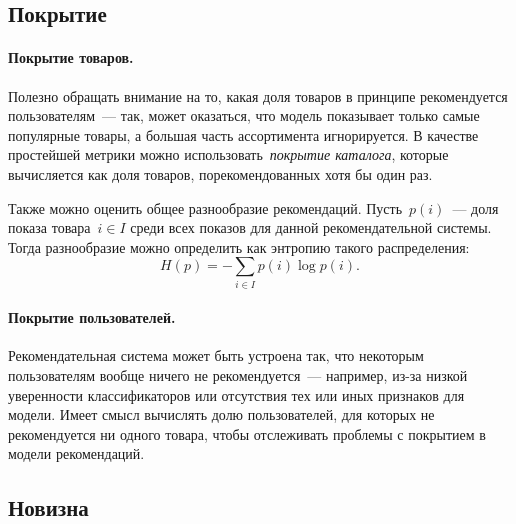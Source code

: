 \documentclass[12pt,fleqn]{article}
\begin{document}
\subsection{Покрытие}


\paragraph{Покрытие товаров.}
Полезно обращать внимание на то, какая доля товаров в принципе рекомендуется пользователям~---
так, может оказаться, что модель показывает только самые популярные товары,
а большая часть ассортимента игнорируется.
В качестве простейшей метрики можно использовать~\emph{покрытие каталога},
которые вычисляется как доля товаров, порекомендованных хотя бы один раз.

Также можно оценить общее разнообразие рекомендаций.
Пусть~$p(i)$~--- доля показа товара~$i \in I$ среди всех показов для данной рекомендательной системы.
Тогда разнообразие можно определить как энтропию такого распределения:
\[
    H(p)
    =
    -\sum_{i \in I}
        p(i) \log p(i).
\]

\paragraph{Покрытие пользователей.}
Рекомендательная система может быть устроена так, что некоторым пользователям вообще ничего не рекомендуется~---
например, из-за низкой уверенности классификаторов или отсутствия тех или иных признаков для модели.
Имеет смысл вычислять долю пользователей, для которых не рекомендуется ни одного товара,
чтобы отслеживать проблемы с покрытием в модели рекомендаций.

\subsection{Новизна}



\end{document}
